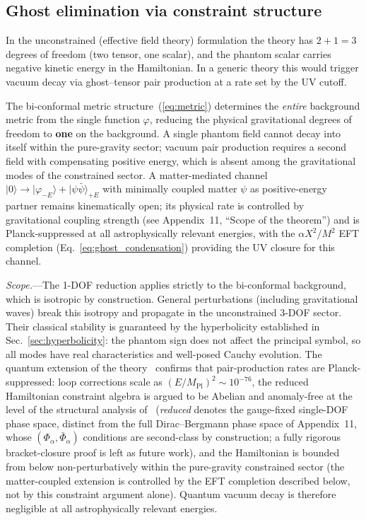 \documentclass[aps,prd,onecolumn,superscriptaddress,nofootinbib,showpacs,12pt]{revtex4-2}
\newcommand{\Mpl}{M_{\mathrm{Pl}}}
\begin{document}
\subsection{Ghost elimination via constraint structure}
\label{sec:ghost}

In the unconstrained (effective field theory) formulation
the theory has $2 + 1 = 3$ degrees of freedom (two tensor,
one scalar), and the phantom scalar carries negative
kinetic energy in the Hamiltonian.  In a generic theory
this would trigger vacuum decay via ghost--tensor pair
production at a rate set by the UV cutoff.

The bi-conformal metric
structure~(\ref{eq:metric}) determines the \emph{entire}
background metric from the single function $\varphi$,
reducing the physical gravitational degrees of freedom to
\textbf{one} on the background.  A single phantom field
cannot decay into itself within the pure-gravity sector;
vacuum pair production requires a second field with
compensating positive energy, which is absent among
the gravitational modes of the constrained sector.
A matter-mediated channel
$|0\rangle\to|\varphi_{-E}\rangle+|\psi\bar\psi\rangle_{+E}$
with minimally coupled matter $\psi$ as positive-energy
partner remains kinematically open; its physical rate is
controlled by gravitational coupling strength (see
Appendix~11, ``Scope of the theorem'') and is
Planck-suppressed at all astrophysically relevant energies,
with the $\alpha X^{2}/M^{2}$ EFT completion
(Eq.~\ref{eq:ghost_condensation}) providing the UV
closure for this channel.

\textit{Scope.}---The 1-DOF reduction applies strictly to
the bi-conformal background, which is isotropic by
construction.  General perturbations (including
gravitational waves) break this isotropy and propagate in
the unconstrained 3-DOF sector.  Their classical stability
is guaranteed by the hyperbolicity established in
Sec.~\ref{sec:hyperbolicity}: the phantom sign does not affect
the principal symbol, so all modes have real characteristics
and well-posed Cauchy evolution.  The quantum extension
of the theory~\cite{Lotishvili2026Q} confirms that
pair-production rates are Planck-suppressed: loop
corrections scale as $(E/\Mpl)^{2} \sim 10^{-76}$,
the reduced Hamiltonian constraint algebra is argued to be
Abelian and anomaly-free at the level of the structural
analysis of~\cite{Lotishvili2026Q} (\emph{reduced} denotes
the gauge-fixed single-DOF phase space, distinct from the
full Dirac--Bergmann phase space of Appendix~11, whose
$(\Phi_\alpha,\bar\Phi_\alpha)$ conditions are second-class by
construction; a fully rigorous bracket-closure proof is
left as future work), and the Hamiltonian is bounded from
below non-perturbatively within the pure-gravity constrained
sector (the matter-coupled extension is controlled by the
EFT completion described below, not by this constraint
argument alone).
Quantum vacuum decay is therefore negligible at all
astrophysically relevant energies.
\end{document}
